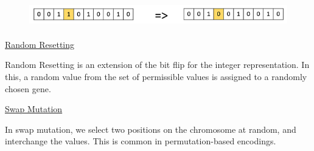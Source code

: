 \documentclass[12pt]{article}
\renewcommand{\_}{\kern-1.5pt\textunderscore\kern-1.5pt}
\begin{document}

\begin{figure}[H]
	\begin{Center}
		\includegraphics[width=6.25in,height=0.45in]{./media/image17.png}
	\end{Center}
\end{figure}



\setlength{\parskip}{8.04pt}
\par


\vspace{\baselineskip}
\setlength{\parskip}{7.2pt}
\begin{adjustwidth}{0.03in}{0.03in}
{\fontsize{14pt}{16.8pt}\selectfont \uline{Random Resetting}\par}\par

\end{adjustwidth}

\begin{adjustwidth}{0.03in}{0.03in}
{\fontsize{11pt}{13.2pt}\selectfont Random Resetting is an extension of the bit flip for the integer representation. In this, a random value from the set of permissible values is assigned to a randomly chosen gene.\par}\par

\end{adjustwidth}


\vspace{\baselineskip}
\begin{adjustwidth}{0.03in}{0.03in}
{\fontsize{14pt}{16.8pt}\selectfont \uline{Swap Mutation}\par}\par

\end{adjustwidth}

\begin{adjustwidth}{0.03in}{0.03in}
{\fontsize{11pt}{13.2pt}\selectfont In swap mutation, we select two positions on the chromosome at random, and interchange the values. This is common in permutation-based encodings.\par}\par

\end{adjustwidth}
\end{document}
